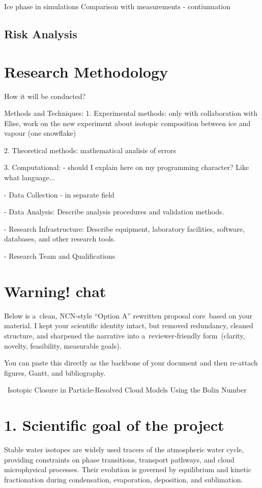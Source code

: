\documentclass[11pt,a4paper]{article}
\begin{document}
Ice phase in simulations
Comparison with measurements - contiunuation

\subsection{Risk Analysis}






\section{Research Methodology}
How it will be conducted?


Methods and Techniques: 
1. Experimental methods: 
  only with collaboration with Elise, work on the new experiment about isotopic composition between ice and vapour (one snowflake)

2. Theoretical methods:
  mathematical analisis of errors

3. Computational: 
 - should I explain here on my programming character? Like what language...

- Data Collection - in separate field

- Data Analysis: Describe analysis procedures and validation methods.

- Research Infrastructure: Describe equipment, laboratory facilities, software, databases,
and other research tools.

- Research Team and Qualifications

\section{Warning! chat}
Below is a clean, NCN-style “Option A” rewritten proposal core based on your material. I kept your scientific identity intact, but removed redundancy, cleaned structure, and sharpened the narrative into a reviewer-friendly form (clarity, novelty, feasibility, measurable goals).

You can paste this directly as the backbone of your document and then re-attach figures, Gantt, and bibliography.

{ Isotopic Closure in Particle-Resolved Cloud Models Using the Bolin Number}
\section*{1. Scientific goal of the project}
Stable water isotopes  are widely used tracers of the atmospheric water cycle, providing constraints on phase transitions, transport pathways, and cloud microphysical processes. Their evolution is governed by equilibrium and kinetic fractionation during condensation, evaporation, deposition, and sublimation.
\end{document}
